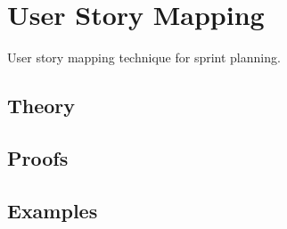 
\section{User Story Mapping}
\label{sec:2.6.09-user-story-mapping}

\begin{ticket}
User story mapping technique for sprint planning.
\end{ticket}

\subsection*{Theory}

\subsection*{Proofs}

\subsection*{Examples}
